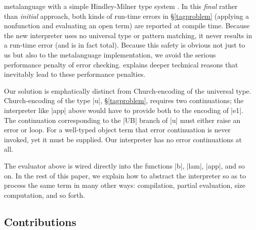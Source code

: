 metalanguage with a simple 
Hindley-Milner 
type system
.  In this \emph{final} rather
than \emph{initial} approach, both kinds of run-time errors in
\S\ref{tagproblem} (applying a nonfunction and evaluating an open
term) are reported at compile time. Because the new interpreter
uses no universal type or pattern matching, it never results in a
run-time error (and is in fact total).  Because this safety is obvious
not just to us but also to the metalanguage implementation, we avoid
the serious performance penalty \cite{WalidICFP02} of error checking.
 explains deeper technical reasons that
inevitably lead to these performance penalties.

Our solution is emphatically distinct from Church-encoding of the
universal type. Church-encoding of the type |u|, \S\ref{tagproblem},
requires two continuations; the interpreter like |app| above would
have to provide both to the encoding of |e1|. The continuation
corresponding to the |UB| branch of |u| must either raise an error or
loop. For a well-typed object term that error continuation is never
invoked, yet it must be supplied. Our interpreter has no error
continuations at all.

The evaluator above is wired directly into the
functions |b|, |lam|, |app|, and so on.  In the rest of this paper, 
we explain how to abstract the interpreter so as
to process the same term in many other
ways: compilation, partial evaluation, size
computation, and so forth.

\subsection{Contributions}\label{contributions}

